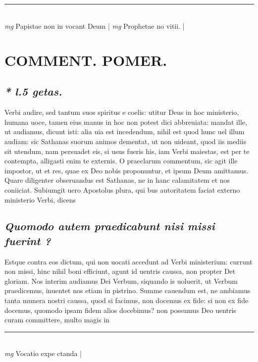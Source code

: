 \documentclass{article}
\begin{document}
\begin{pages}
\subsection*{\textit{}}
\vspace{0.5cm}\noindent
\vspace{0.2cm}\rule{1cm}{0.2pt}\\ 
\hspace{0.2cm}\textit{mg}
\footnotesize Papistae non in vocant Deum 
\normalsize| 
\hspace{0.2cm}\textit{mg}
\footnotesize Prophetae no vitii.  
\normalsize| 
\section*{COMMENT. POMER.  }
{}
\subsection*{\textit{* l.5 getas.  }}\pstart Verbi audire, sed tantum suos spiritus e coelis: utitur Deus in hoc ministerio, humana uoce, tamen eius manus in hoc non potest dici abbreuiata: mandat ille, ut audiamus, dicunt isti: alia uia est incedendum, nihil est quod hunc uel illum audiam: sic Sathanas suorum animos dementat, ut non uideant, quod iis mediis sit utendum, nam persuadet eis, si usus fueris his, iam Verbi maiestas, est per te contempta, alligasti enim te externis. O praeclarum commentum, sic agit ille impostor, ut et res, quae ex Deo nobis proponuntur, et ipsum Deum amittamus. Quare diligenter obseruandus est Sathanas, ne in hanc calamitatem et nos coniiciat. Subiumgit uero Apostolus plura, qui bus autoritatem faciat externo ministerio Verbi, dicens  \pend
{}
{}
\subsection*{\textit{Quomodo autem praedicabunt nisi missi fuerint ? }}\pstart Estque contra eos dictum, qui non uocati accedunt ad Verbi ministerium: currunt non missi, hinc nihil boni efficiunt, agunt id uentris caussa, non propter Det gloriam. Nos interim audiamus Dei Verbum, siquando is uoluerit, ut Verbum praedicemus, inuentet nos etiam in pistrino. Summe cauendum est, ne ambiamus tanta munera nostri caussa, quod si facimus, non docemus ex fide: si non ex fide docemus, quomodo ipsam fidem alios docebimus? non possumus Deo uentris curam committere, multo magis in  \pend
\vspace{0.5cm}\noindent
\vspace{0.2cm}\rule{1cm}{0.2pt}\\ 
\hspace{0.2cm}\textit{mg}
\footnotesize Vocatio expe ctanda
\normalsize| 

\end{pages}
\end{document}
